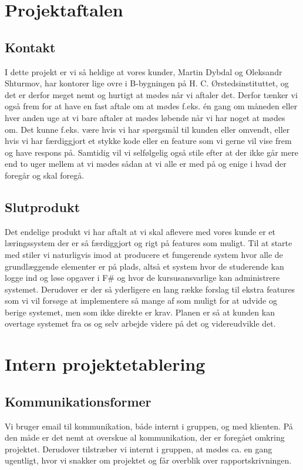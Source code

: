 \documentclass[12pt]{article}
\begin{document}
\section{Projektaftalen}
\subsection{Kontakt}
I dette projekt er vi så heldige at vores kunder, Martin Dybdal og Oleksandr Shturmov, har kontorer lige ovre i B-bygningen på H. C. Ørstedsinstituttet, og det er derfor meget nemt og hurtigt at mødes når vi aftaler det. Derfor tænker vi også frem for at have en fast aftale om at mødes f.eks. én gang om måneden eller hver anden uge at vi bare aftaler at mødes løbende når vi har noget at mødes om. Det kunne f.eks. være hvis vi har spørgsmål til kunden eller omvendt, eller hvis vi har færdiggjort et stykke kode eller en feature som vi gerne vil vise frem og have respons på. Samtidig vil vi selfølgelig også stile efter at der ikke går mere end to uger mellem at vi mødes sådan at vi alle er med på og enige i hvad der foregår og skal foregå.

\subsection{Slutprodukt}
Det endelige produkt vi har aftalt at vi skal aflevere med vores kunde er et læringssystem der er så færdiggjort og rigt på features som muligt. Til at starte med stiler vi naturligvis imod at producere et fungerende system hvor alle de grundlæggende elementer er på plads, altså et system hvor de studerende kan logge ind og løse opgaver i F\# og hvor de kursusansvarlige kan administrere systemet. Derudover er der så yderligere en lang række forslag til ekstra features som vi vil forsøge at implementere så mange af som muligt for at udvide og berige systemet, men som ikke direkte er krav. Planen er så at kunden kan overtage systemet fra os og selv arbejde videre på det og videreudvikle det.


\section{Intern projektetablering}
\subsection{Kommunikationsformer}
Vi bruger email til kommunikation, både internt i gruppen, og med klienten. På den måde er det nemt at overskue al kommunikation, der er foregået omkring projektet.
Derudover tilstræber vi internt i gruppen, at mødes ca. en gang ugentligt, hvor vi snakker om projektet og får overblik over rapportskrivningen.
\end{document}
